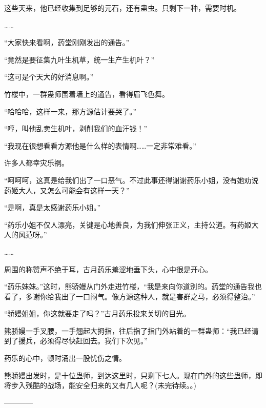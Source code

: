 \begin{this_body}
这些天来，他已经收集到足够的元石，还有蛊虫。只剩下一种，需要时机。

……

“大家快来看啊，药堂刚刚发出的通告。”

“竟然是要征集九叶生机草，统一生产生机叶？”

“这可是个天大的好消息啊。”

竹楼中，一群蛊师围着墙上的通告，看得眉飞色舞。

“哈哈哈，这样一来，那方源估计要哭了。”

“哼，叫他乱卖生机叶，剥削我们的血汗钱！”

“我现在很想看看方源他是什么样的表情啊……一定非常难看。”

许多人都幸灾乐祸。

“呵呵呵，这真是给我们出了一口恶气。不过此事还得谢谢药乐小姐，没有她劝说药姬大人，又怎么可能会有这样一天？”

“是啊，真是太感谢药乐小姐。”

“药乐小姐不仅人漂亮，关键是心地善良，为我们伸张正义，主持公道。有药姬大人的风范呀。”

……

周围的称赞声不绝于耳，古月药乐羞涩地垂下头，心中很是开心。

“药乐妹妹。”这时，熊骄嫚从门外走进竹楼，“我是来向你道别的。药堂的通告我也看了，多谢你给我出了一口闷气。像方源这种人，就是害群之马，必须得整治。”

“骄嫚姐姐，你这就要走了吗？”古月药乐投来关切的目光。

熊骄嫚一手叉腰，一手翘起大拇指，往后指了指门外站着的一群蛊师：“我已经请到了援兵，必须得尽快赶回去。我们下次见。”

药乐的心中，顿时涌出一股忧伤之情。

熊骄嫚出发时，是十位蛊师，到达这里时，只剩下七人。现在门外的这些蛊师，即将步入残酷的战场，能安全归来的又有几人呢？(未完待续。。)

------------

\end{this_body}

